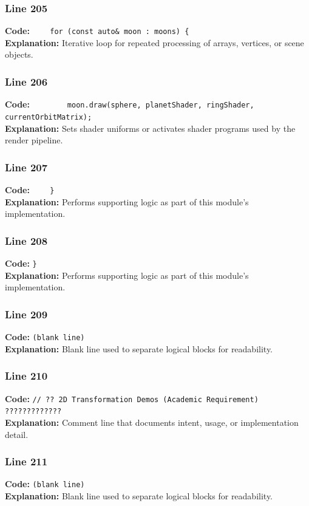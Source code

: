 \documentclass[11pt,a4paper]{article}
\begin{document}
\subsubsection*{Line 205}
\textbf{Code:} \verb|    for (const auto& moon : moons) {|\\
\textbf{Explanation:} Iterative loop for repeated processing of arrays, vertices, or scene objects.

\subsubsection*{Line 206}
\textbf{Code:} \verb|        moon.draw(sphere, planetShader, ringShader, currentOrbitMatrix);|\\
\textbf{Explanation:} Sets shader uniforms or activates shader programs used by the render pipeline.

\subsubsection*{Line 207}
\textbf{Code:} \verb|    }|\\
\textbf{Explanation:} Performs supporting logic as part of this module's implementation.

\subsubsection*{Line 208}
\textbf{Code:} \verb|}|\\
\textbf{Explanation:} Performs supporting logic as part of this module's implementation.

\subsubsection*{Line 209}
\textbf{Code:} \texttt{(blank line)}\\
\textbf{Explanation:} Blank line used to separate logical blocks for readability.

\subsubsection*{Line 210}
\textbf{Code:} \verb|// ?? 2D Transformation Demos (Academic Requirement) ?????????????|\\
\textbf{Explanation:} Comment line that documents intent, usage, or implementation detail.

\subsubsection*{Line 211}
\textbf{Code:} \texttt{(blank line)}\\
\textbf{Explanation:} Blank line used to separate logical blocks for readability.
\end{document}
